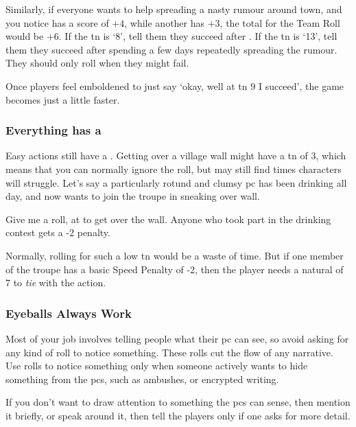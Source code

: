 \begin{multicols}{2}
Similarly, if everyone wants to help spreading a nasty rumour around town, and you notice  has a  score of $+4$, while another has $+3$, the total for the Team Roll would be $+6$.
If the \gls{tn} is `8', tell them they succeed after .
If the \gls{tn} is `13', tell them they succeed after spending a few days repeatedly spreading the rumour.
They should only roll when they might fail.

Once players feel emboldened to just say `okay, well at \gls{tn} 9 I succeed', the game becomes just a little faster.

\subsubsection{Everything has a }

Easy actions still have a . 
Getting over a \gls{village} wall might have a \gls{tn} of 3, which means that you can normally ignore the roll, but may still find times characters will struggle.
Let's say a particularly rotund and clumsy \gls{pc} has been drinking all day, and now wants to join the troupe in sneaking over  wall.

\begin{speechtext}
  Give me a  roll, at \tn[3] to get over the wall.
  Anyone who took part in the drinking contest gets a -2 penalty.
\end{speechtext}

\noindent
Normally, rolling for such a low \gls{tn} would be a waste of time.
But if one member of the troupe has a basic Speed Penalty of -2, then the player needs a \gls{natural} of 7 to \emph{tie} with the action.

\subsubsection{Eyeballs Always Work}

Most of your job involves telling people what their \gls{pc} can see, so avoid asking for any kind of roll to notice something.
These rolls cut the flow of any narrative.
Use rolls to notice something only when someone actively wants to hide something from the \glspl{pc}, such as ambushes, or encrypted writing.

If you don't want to draw attention to something the \glspl{pc} can sense, then mention it briefly, or speak around it, then tell the players only if one asks for more detail.


\end{multicols}

